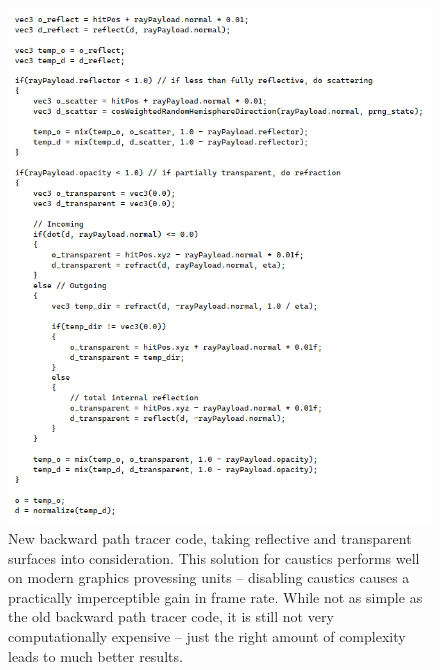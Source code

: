 \documentclass[12pt]{article}
\begin{document}
\begin{figure} 
\centering
  \includegraphics[width = 6 in]{fig4.png}
  \caption{ New backward path tracer code, taking reflective and transparent surfaces into consideration.
This solution for caustics performs well on modern graphics provessing units -- disabling caustics causes a practically imperceptible gain in frame rate.
While not as simple as the old backward path tracer code, it is still not very computationally expensive -- just the right amount of complexity leads to much better results.
}
\end{figure}
\end{document}
